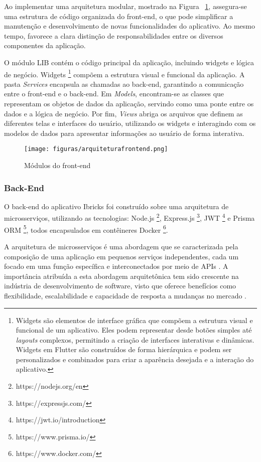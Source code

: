 \documentclass[12pt]{article}
\begin{document}
Ao implementar uma arquitetura modular, mostrado na Figura ~\ref{fig:frontend}, assegura-se uma estrutura de código organizada do front-end, o que pode simplificar a manutenção e desenvolvimento de novas funcionalidades do aplicativo. Ao mesmo tempo, favorece a clara distinção de responsabilidades entre os diversos componentes da aplicação. 

O módulo LIB contém o código principal da aplicação, incluindo widgets e lógica de negócio. Widgets \footnote{Widgets são elementos de interface gráfica que compõem a estrutura visual e funcional de um aplicativo. Eles podem representar desde botões simples até \textit{layouts} complexos, permitindo a criação de interfaces interativas e dinâmicas. Widgets em Flutter são construídos de forma hierárquica e podem ser personalizados e combinados para criar a aparência desejada e a interação do aplicativo.} compõem a estrutura visual e funcional da aplicação. A pasta \textit{Services} encapsula as chamadas ao back-end, garantindo a comunicação entre o front-end e o back-end. Em \textit{Models}, encontram-se as classes que representam os objetos de dados da aplicação, servindo como uma ponte entre os dados e a lógica de negócio. Por fim, \textit{Views} abriga os arquivos que definem as diferentes telas e interfaces do usuário, utilizando os widgets e interagindo com os modelos de dados para apresentar informações ao usuário de forma interativa.

\begin{figure}[!htb]
\centering
\texttt{[image: figuras/arquiteturafrontend.png]}
\caption{Módulos do front-end}
\label{fig:frontend}
\end{figure}

\subsubsection{Back-End}

O back-end do aplicativo Ibricks foi construído sobre uma arquitetura de microsserviços, utilizando as tecnologias: Node.js \footnote{https://nodejs.org/en}, Express.js \footnote{https://expressjs.com/}, JWT \footnote{https://jwt.io/introduction} e Prisma ORM \footnote{https://www.prisma.io/}, todos encapsulados em contêineres Docker \footnote{https://www.docker.com/}.

A arquitetura de microsserviços é uma abordagem que se caracterizada pela composição de uma aplicação em pequenos serviços independentes, cada um focado em uma função específica e interconectados por meio de APIs \cite{fowler2014microservices}. A importância atribuída a esta abordagem arquitetônica tem sido crescente na indústria de desenvolvimento de software, visto que oferece benefícios como flexibilidade, escalabilidade e capacidade de resposta a mudanças no mercado \cite{newman2015building}.
\end{document}
